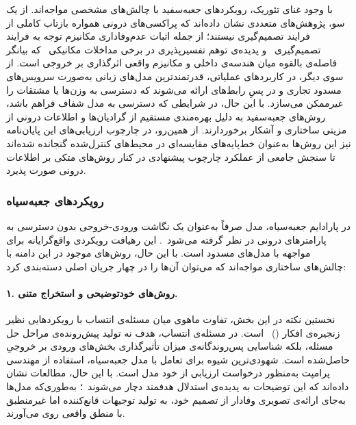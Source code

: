 با وجود غنای تئوریک، رویکردهای جعبه‌سفید با چالش‌های مشخصی مواجه‌اند. از یک سو، پژوهش‌های متعددی نشان داده‌اند که پراکسی‌های درونی همواره بازتاب کاملی از فرایند تصمیم‌گیری نیستند؛ از جمله اثبات عدم‌وفاداری مکانیزم توجه به فرایند تصمیم‌گیری~\cite{jain2019attention} و پدیده‌ی توهم تفسیرپذیری در برخی مداخلات مکانیکی~\cite{friedman2023comparing} که بیانگر فاصله‌ی بالقوه میان هندسه‌ی داخلی و مکانیزم واقعی اثرگذاری بر خروجی است. از سوی دیگر، در کاربردهای عملیاتی، قدرتمندترین مدل‌های زبانی به‌صورت سرویس‌های مسدود تجاری و در پسِ رابط‌های  ارائه می‌شوند که دسترسی به وزن‌ها یا مشتقات را غیرممکن می‌سازد. با این حال، در شرایطی که دسترسی به مدل شفاف فراهم باشد، روش‌های جعبه‌سفید به دلیل بهره‌مندی مستقیم از گرادیان‌ها و اطلاعات درونی از مزیتی ساختاری و آشکار برخوردارند. از همین‌رو، در چارچوب ارزیابی‌های این پایان‌نامه نیز این روش‌ها به‌عنوان خط‌پایه‌های مقایسه‌ای در محیط‌های کنترل‌شده گنجانده شده‌اند تا سنجش جامعی از عملکرد چارچوب پیشنهادی در کنار روش‌های متکی بر اطلاعات درونی صورت پذیرد.

\subsubsection{رویکردهای جعبه‌سیاه}\label{sec:1-3-2-2}

در پارادایم جعبه‌سیاه، مدل صرفاً به‌عنوان یک نگاشت ورودی-خروجی بدون دسترسی به پارامترهای درونی در نظر گرفته می‌شود~\cite{guidotti2018survey}. این رهیافت رویکردی واقع‌گرایانه برای مواجهه با مدل‌های مسدود است. با این حال، روش‌های موجود در این دامنه با چالش‌های ساختاری مواجه‌اند که می‌توان آن‌ها را در چهار جریان اصلی دسته‌بندی کرد:

\paragraph{۱. روش‌های خودتوضیحی و استخراج متنی.}
نخستین نکته در این بخش، تفاوت ماهوی میان مسئله‌ی انتساب با رویکردهایی نظیر زنجیره‌ی افکار ()~\cite{wei2022chain} است. در مسئله‌ی انتساب، هدف نه تولید پیش‌رونده‌ی مراحل حل مسئله، بلکه شناسایی پس‌روندگانه‌ی میزان تأثیرگذاری بخش‌های ورودی بر خروجیِ حاصل‌شده است. شهودی‌ترین شیوه برای تعامل با مدل جعبه‌سیاه، استفاده از مهندسی پرامپت به‌منظور درخواست ارزیابی از خود مدل است. با این حال، مطالعات نشان داده‌اند که این توضیحات به پدیده‌ی استدلال هدفمند دچار می‌شوند~\cite{turpin2023language}؛ به‌طوری‌که مدل‌ها به‌جای ارائه‌ی تصویری وفادار از تصمیم خود، به تولید توجیهات قانع‌کننده اما غیرمنطبق با منطق واقعی روی می‌آورند.

